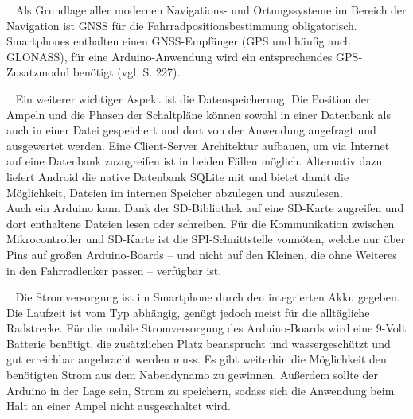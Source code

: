 \begin{description}[leftmargin=0.7cm,style=nextline]
  \item[\gls{GNSS}] ~ Als Grundlage aller modernen Navigations- und Ortungssysteme im Bereich der Navigation ist \gls{GNSS} für die Fahrradpositionsbestimmung obligatorisch. \glspl{Smartphone} enthalten einen \gls{GNSS}-Empfänger (\gls{GPS} und häufig auch \gls{GLONASS}), für eine \gls{Arduino}-Anwendung wird ein entsprechendes \gls{GPS}-Zusatzmodul benötigt (vgl. \cite{arduino} S. 227).\\
 \item[Datenspeicherung] ~ Ein weiterer wichtiger Aspekt ist die Datenspeicherung. Die Position der Ampeln und die Phasen der Schaltpläne können sowohl in einer Datenbank als auch in einer Datei gespeichert und dort von der Anwendung angefragt und ausgewertet werden. Eine Client-Server Architektur aufbauen, um via Internet auf eine Datenbank zuzugreifen ist in beiden Fällen möglich. Alternativ dazu liefert Android die native Datenbank SQLite mit und bietet damit die Möglichkeit, Dateien im internen Speicher abzulegen und auszulesen.\\ 
Auch ein \gls{Arduino} kann Dank der SD-Bibliothek auf eine SD-Karte zugreifen und dort enthaltene Dateien lesen oder schreiben. Für die Kommunikation zwischen Mikrocontroller und SD-Karte ist die SPI-Schnittstelle vonnöten, welche nur über Pins auf großen \gls{Arduino}-Boards -- und nicht auf den Kleinen, die ohne Weiteres in den Fahrradlenker passen -- verfügbar ist.\cite{arduino_sd}\\
  \item[Stromversorgung] ~ Die Stromversorgung ist im \gls{Smartphone} durch den integrierten Akku gegeben. Die Laufzeit ist vom Typ abhängig, genügt jedoch meist für die alltägliche Radstrecke. Für die mobile Stromversorgung des \gls{Arduino}-Boards wird eine 9-Volt Batterie benötigt, die zusätzlichen Platz beansprucht und wassergeschützt und gut erreichbar angebracht werden muss. Es gibt weiterhin die Möglichkeit den benötigten Strom aus dem Nabendynamo zu gewinnen. Außerdem sollte der \gls{Arduino} in der Lage sein, Strom zu speichern, sodass sich die Anwendung beim Halt an einer Ampel nicht ausgeschaltet wird.\\

\end{description}
